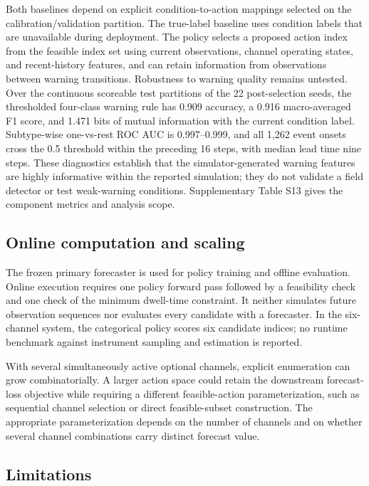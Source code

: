 Both baselines depend on explicit condition-to-action mappings selected on the
calibration/validation partition. The true-label baseline uses condition labels
that are unavailable during deployment. The policy selects a proposed action
index from the feasible index set using current observations, channel operating states, and
recent-history features, and can retain information from observations between
warning transitions. Robustness to warning quality remains untested.
Over the continuous scoreable test partitions of the 22 post-selection seeds,
the thresholded four-class warning rule has 0.909 accuracy, a 0.916
macro-averaged F1 score, and 1.471 bits of mutual information with the current
condition label. Subtype-wise one-vs-rest ROC AUC is 0.997--0.999, and all 1,262
event onsets cross the 0.5 threshold within the preceding 16 steps, with median
lead time nine steps. These diagnostics establish that the simulator-generated
warning features are highly informative within the reported simulation; they do
not validate a field detector or test weak-warning conditions.
Supplementary Table S13 gives the component
metrics and analysis scope.

\subsection{Online computation and scaling}

The frozen primary forecaster is used for policy training and offline evaluation.
Online execution requires one policy forward pass
followed by a feasibility check and one check of the
minimum dwell-time constraint. It neither
simulates future observation sequences nor evaluates every candidate with a
forecaster. In the six-channel system, the categorical policy scores six
candidate indices; no runtime benchmark against instrument sampling and
estimation is reported.

With several simultaneously active optional channels, explicit enumeration can
grow combinatorially. A larger action space could retain the downstream
forecast-loss objective while requiring a different feasible-action
parameterization, such as sequential channel selection or direct feasible-subset
construction. The appropriate parameterization depends on the number of
channels and on whether several channel combinations carry distinct forecast
value.

\subsection{Limitations}

